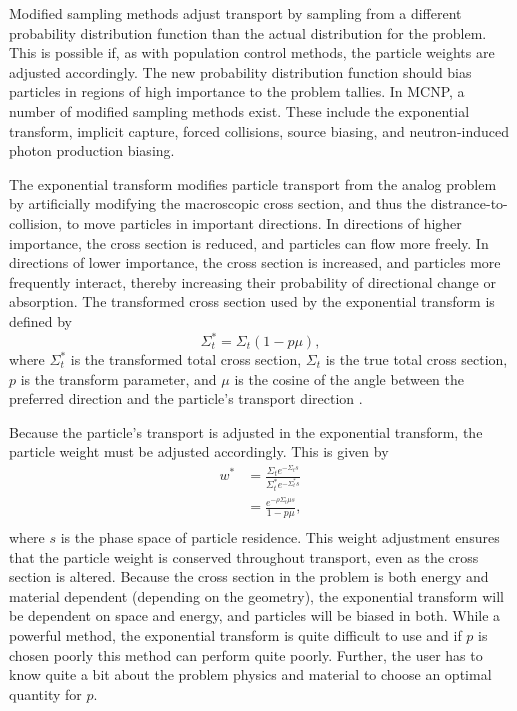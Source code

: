 Modified sampling methods adjust transport by sampling from a different probability
distribution function than the actual distribution for the problem. This is
possible if, as with population control methods, the particle weights are adjusted
 accordingly.
 The new probability distribution function should bias particles in regions of high
 importance to the problem tallies. In MCNP, a number of modified sampling
 methods exist.
 These include the exponential transform, implicit capture, forced collisions, source
 biasing, and neutron-induced photon production biasing.

The exponential transform modifies particle transport from the analog problem by
artificially modifying the macroscopic cross section, and thus the
distrance-to-collision, to move particles in important directions. In directions
of higher importance, the cross section is reduced, and particles can flow more
freely. In directions of lower importance, the cross section is increased, and
particles more frequently interact, thereby increasing their probability of
directional change or absorption. The transformed cross section used by the
exponential transform is defined by
%
\begin{equation*}
  \Sigma_t^* = \Sigma_t(1-p\mu) ,
\end{equation*}
%
where $\Sigma_t^*$ is the transformed total cross section, $\Sigma_t$ is the
true total cross section, $p$ is the transform parameter, and $\mu$ is the
cosine of the angle between the preferred direction and the particle's transport
direction \cite{mcnp_manual_v1, mcnp_manual_v2, hendricks_mcnp_1985}.

Because the particle's transport is adjusted in the exponential transform, the
particle weight must be adjusted accordingly. This is given by
%
\begin{equation*}
  \begin{split}
  w^* &= \frac{\Sigma_t e^{-\Sigma_t s}}{\Sigma_t^* e^{-\Sigma_t^* s}} \\
      &= \frac{e^{-\rho \Sigma_t \mu s}}{1-p\mu}, \\
  \end{split}
\end{equation*}
%
where $s$ is the phase space of particle residence. This weight adjustment
ensures that the particle weight is conserved throughout transport, even as
the cross section is altered. Because the cross section in the problem is both
energy and material dependent (depending on the geometry), the exponential
transform will be dependent on space and energy, and particles will be biased in
both. While a powerful method, the exponential transform is quite difficult to
use and if $p$ is chosen poorly this method can perform quite poorly. Further,
the user has to know quite a bit about the problem physics and material to choose an
optimal quantity for $p$.

